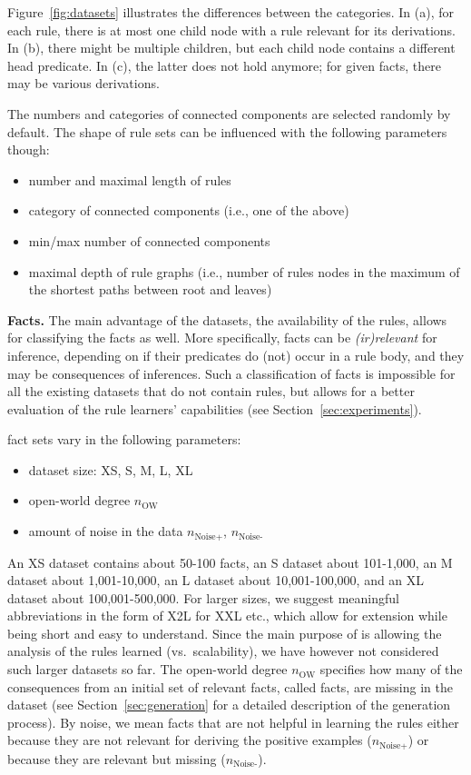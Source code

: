 \documentclass[letterpaper]{article} \usepackage{aaai20}  \usepackage{times}  \usepackage{helvet} \usepackage{courier}  \usepackage[hyphens]{url}  \usepackage{graphicx} \urlstyle{rm} \def\UrlFont{\rm}  \usepackage{graphicx}  \frenchspacing  \setlength{\pdfpagewidth}{8.5in}  \setlength{\pdfpageheight}{11in}  \usepackage{amsthm}
\theoremstyle{definition}
\newcommand{\support}{\text{support}\xspace}
\newcommand{\tool}{\text{RuDaS}\xspace}
\newcommand{\nowa}{\ensuremath{n_{\text{OW}}}\xspace}
\newcommand{\nnoiseadd}{\ensuremath{n_{\text{Noise+}}}\xspace}
\newcommand{\nnoisemiss}{\ensuremath{n_{\text{Noise-}}}\xspace}
\begin{document}
Figure~\ref{fig:datasets} illustrates the differences between the categories. In (a), for each rule, there is at most one child node with a rule relevant for its derivations.
In (b), there might be multiple children, but each child node contains a different head predicate. In (c), the latter does not hold anymore; for given facts, there may be various derivations. 

The numbers and categories of connected components are selected randomly by default.
The shape of \tool rule sets can be influenced with the following parameters though: 

\begin{itemize}
\item number and maximal length of rules
\item category of connected components (i.e., one of the above)\item min/max number of connected components
\item maximal depth of rule graphs (i.e., number of rules nodes in the maximum of the shortest paths between root and leaves)
\end{itemize}

\textbf{Facts.} 
The main advantage of the \tool datasets, the availability of the rules, allows for classifying the facts as well. More specifically, facts can be \emph{(ir)relevant} for inference, depending on if their predicates do (not) occur in a rule body, and they may be consequences of inferences.
Such a classification of facts is impossible for all the existing datasets that do not contain rules, but allows for a better evaluation of the rule learners' capabilities (see Section~\ref{sec:experiments}).  

\tool fact sets vary in the following parameters:
\begin{itemize}
\item dataset size: XS, S, M, L, XL
\item open-world degree \nowa  \item amount of noise in the data \nnoiseadd, \nnoisemiss  \end{itemize}
An XS dataset contains about 50-100 facts, 
an S dataset about 101-1,000, 
an M dataset about 1,001-10,000,
an L dataset about 10,001-100,000,
and an XL dataset about 100,001-500,000. For larger sizes, we suggest meaningful abbreviations in the form of X2L for XXL etc., which allow for extension while being short and easy to understand.
Since the main purpose of \tool is allowing the analysis of the rules learned (vs.\ scalability), we have however not considered such larger datasets so far. The open-world degree \nowa specifies how many of the consequences from an initial set of relevant facts, called \emph{\support} facts, are missing in the dataset (see Section~\ref{sec:generation} for a detailed description of the generation process).
By noise, we mean facts that are not helpful in learning the rules either because they are not relevant for deriving the positive examples (\nnoiseadd) or because they are relevant but missing (\nnoisemiss).
\end{document}
